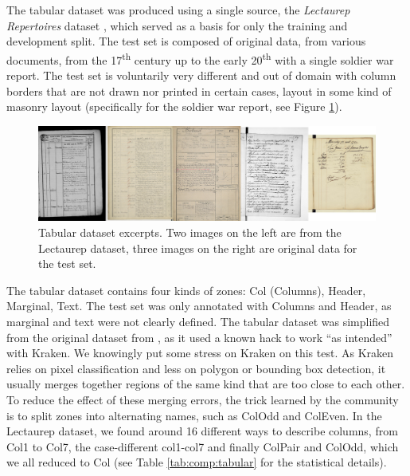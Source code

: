 \documentclass{jdmdh}
\begin{document}
The tabular dataset was produced using a single source, the \textit{Lectaurep Repertoires} dataset \citep{p2021notaires}, which served as a basis for only the training and development split. The test set is composed of original data, from various documents, from the 17\textsuperscript{th} century up to the early 20\textsuperscript{th} with a single soldier war report. The test set is voluntarily very different and out of domain with column borders that are not drawn nor printed in certain cases, layout in some kind of masonry layout (specifically for the soldier war report, see Figure \ref{fig:dataset:table}).

\begin{figure}
    \centering
    \includegraphics[width=\linewidth]{images/table.jpg}
    \caption{Tabular dataset excerpts. Two images on the left are from the Lectaurep dataset, three images on the right are original data for the test set.}
    \label{fig:dataset:table}
\end{figure}

The tabular dataset contains four kinds of zones: Col (Columns), Header, Marginal, Text. The test set was only annotated with Columns and Header, as marginal and text were not clearly defined. The tabular dataset was simplified from the original dataset from \citet{p2021notaires}, as it used a known hack to work ``as intended'' with Kraken. We knowingly put some stress on Kraken on this test. As Kraken relies on pixel classification and less on polygon or bounding box detection, it usually merges together regions of the same kind that are too close to each other. To reduce the effect of these merging errors, the trick learned by the community is to split zones into alternating names, such as ColOdd and ColEven. In the Lectaurep dataset, we found around 16 different ways to describe columns, from Col1 to Col7, the case-different col1-col7 and finally ColPair and ColOdd, which we all reduced to Col (see Table \ref{tab:comp:tabular} for the statistical details).
\end{document}
